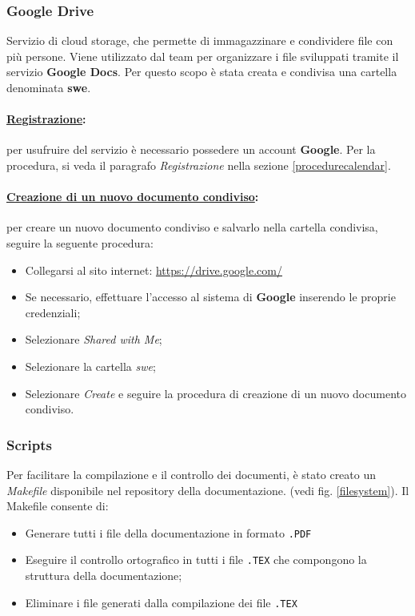 \subsubsection{Google Drive}
\label{googledrive}
Servizio di cloud storage, che permette di immagazzinare e condividere file con più persone. Viene utilizzato dal team per organizzare i file sviluppati tramite il servizio \textbf{Google Docs}\g{}. Per questo scopo è stata creata e condivisa una cartella denominata \textbf{swe}.

\paragraph{\underline{Registrazione}:} per usufruire del servizio è necessario possedere un account \textbf{Google}. Per la procedura, si veda il paragrafo \textit{Registrazione} nella sezione \ref{procedurecalendar}.

\paragraph{\underline{Creazione di un nuovo documento condiviso}:} per creare un nuovo documento condiviso e salvarlo nella cartella condivisa, seguire la seguente procedura:
\begin{itemize}
\item Collegarsi al sito internet: \url{https://drive.google.com/}
\item Se necessario, effettuare l'accesso al sistema di \textbf{Google} inserendo le proprie credenziali;
\item Selezionare \textit{Shared with Me};
\item Selezionare la cartella \textit{swe};
\item Selezionare \textit{Create} e seguire la procedura di creazione di un nuovo documento condiviso.
\end{itemize}

\subsubsection{Scripts}
\label{scripts}
Per facilitare la compilazione e il controllo dei documenti, è stato creato un \textit{Makefile} disponibile nel repository\g{} della documentazione. (vedi fig. \ref{filesystem}). Il Makefile consente di:
\begin{itemize}
\item Generare tutti i file della documentazione in formato \verb!.PDF!
\item Eseguire il controllo ortografico in tutti i file \verb!.TEX! che compongono la struttura della documentazione;
\item Eliminare i file generati dalla compilazione dei file \verb!.TEX!
\end{itemize}

